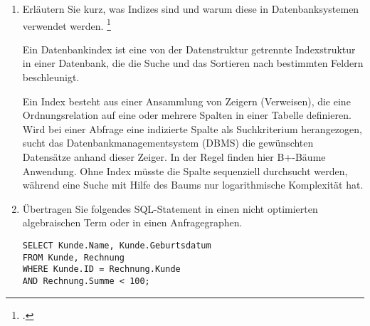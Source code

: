 \documentclass{bschlangaul-aufgabe}
\begin{document}

\begin{enumerate}


\item Erläutern Sie kurz, was Indizes sind und warum diese in
Datenbanksystemen verwendet werden.
\footcite{examen:66116:2021:03}

\begin{liAntwort}
Ein Datenbankindex ist eine von der Datenstruktur getrennte
Indexstruktur in einer Datenbank, die die Suche und das Sortieren nach
bestimmten Feldern beschleunigt.

Ein Index besteht aus einer Ansammlung von Zeigern (Verweisen), die eine
Ordnungsrelation auf eine oder mehrere Spalten in einer Tabelle
definieren. Wird bei einer Abfrage eine indizierte Spalte als
Suchkriterium herangezogen, sucht das Datenbankmanagementsystem (DBMS)
die gewünschten Datensätze anhand dieser Zeiger. In der Regel finden
hier B+-Bäume Anwendung. Ohne Index müsste die Spalte sequenziell
durchsucht werden, während eine Suche mit Hilfe des Baums nur
logarithmische Komplexität hat.
\end{liAntwort}


\item Übertragen Sie folgendes SQL-Statement in einen nicht optimierten
algebraischen Term oder in einen Anfragegraphen.

\begin{verbatim}
SELECT Kunde.Name, Kunde.Geburtsdatum
FROM Kunde, Rechnung
WHERE Kunde.ID = Rechnung.Kunde
AND Rechnung.Summe < 100;
\end{verbatim}

\begin{liAntwort}
\begin{center}
\end{center}
\end{liAntwort}
\end{enumerate}
\end{document}
